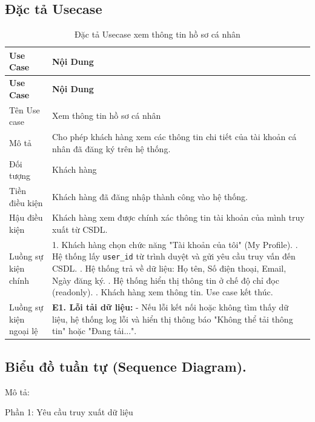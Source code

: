 \documentclass[../BTL.tex]{subfiles}
\begin{document}
\subsection{Đặc tả Usecase}
\begin{longtable}{|p{}|p{}|}
\caption{Đặc tả Usecase xem thông tin hồ sơ cá nhân}\label{tab:usecase-ho-so-ca-nhan}\\
\hline
\textbf{Use Case} & \textbf{Nội Dung} \\
\hline
\endfirsthead
\hline
\textbf{Use Case} & \textbf{Nội Dung} \\
\hline
\endhead
Tên Use case & Xem thông tin hồ sơ cá nhân \\
\hline
Mô tả & Cho phép khách hàng xem các thông tin chi tiết của tài khoản cá nhân đã đăng ký trên hệ thống. \\
\hline
Đối tượng & Khách hàng \\
\hline
Tiền điều kiện & Khách hàng đã đăng nhập thành công vào hệ thống. \\
\hline
Hậu điều kiện & Khách hàng xem được chính xác thông tin tài khoản của mình truy xuất từ CSDL. \\
\hline
Luồng sự kiện chính & 
1. Khách hàng chọn chức năng "Tài khoản của tôi" (My Profile). \newline
2. Hệ thống lấy \texttt{user\_id} từ trình duyệt và gửi yêu cầu truy vấn đến CSDL. \newline
3. Hệ thống trả về dữ liệu: Họ tên, Số điện thoại, Email, Ngày đăng ký. \newline
4. Hệ thống hiển thị thông tin ở chế độ chỉ đọc (readonly). \newline
5. Khách hàng xem thông tin. Use case kết thúc. \\
\hline
Luồng sự kiện ngoại lệ & 
\textbf{E1. Lỗi tải dữ liệu:} \newline
- Nếu lỗi kết nối hoặc không tìm thấy dữ liệu, hệ thống log lỗi và hiển thị thông báo "Không thể tải thông tin" hoặc "Đang tải...". \\
\hline
\end{longtable}

\subsection{Biểu đồ tuần tự (Sequence Diagram).}

Mô tả:

Phần 1: Yêu cầu truy xuất dữ liệu
\end{document}
